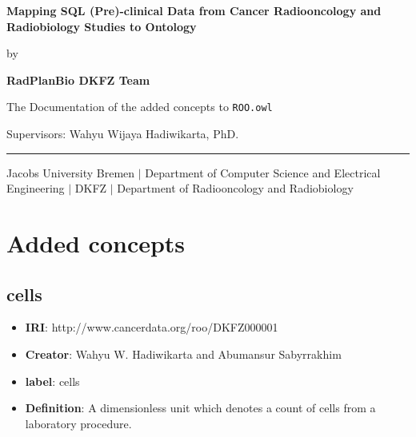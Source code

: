 \documentclass[a4paper,12pt,oneside]{article}
\newcommand{\mylastname}{DKFZ Team}
\newcommand{\myfirstname}{RadPlanBio}
\newcommand{\myname}{\myfirstname{} \mylastname{}}
\newcommand{\mytitle}{Mapping SQL (Pre)-clinical Data from Cancer Radiooncology and
Radiobiology Studies to Ontology}
\newcommand{\mysupervisor}{Wahyu Wijaya Hadiwikarta, PhD.}
\begin{document}

  \thispagestyle{empty}

  \vspace*{40mm}
  \begin{center}
    \huge
    \textbf{\mytitle}
  \end{center}
  \vspace*{4mm}
  \begin{center}
   \Large by
  \end{center}
  \vspace*{4mm}
  \begin{center}
    \LARGE
    \textbf{\myname}
  \end{center}
  \vspace*{20mm}
  \begin{center}
    \Large
    The Documentation of the added concepts to \texttt{ROO.owl}
  \end{center}
  \vfill
  \begin{flushleft}
    \large
    Supervisors: \mysupervisor \\
    \rule{\textwidth}{1pt}
  \end{flushleft}
  \begin{center}
    Jacobs University Bremen $|$ Department of Computer Science and Electrical Engineering $|$ 
    DKFZ $|$ Department of Radiooncology and Radiobiology
  \end{center}

  \newpage
  \thispagestyle{empty}
  
  \newpage
  \tableofcontents

  \clearpage

  \section{Added concepts}

  \subsection{cells}

   \begin{itemize}
      \item \textbf{IRI}: http://www.cancerdata.org/roo/DKFZ000001
      \item \textbf{Creator}: Wahyu W. Hadiwikarta and Abumansur Sabyrrakhim
      \item \textbf{label}: cells
      \item \textbf{Definition}: A dimensionless unit which denotes a count of cells from a laboratory procedure.
  \end{itemize}  
\end{document}
